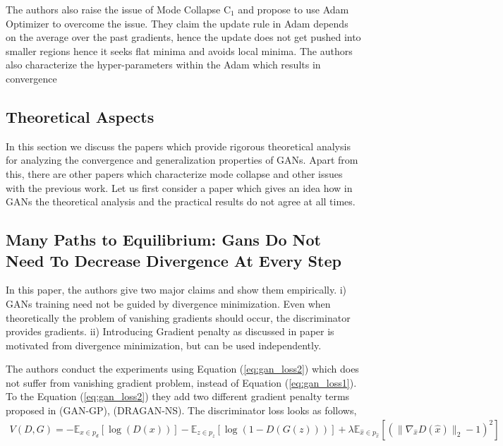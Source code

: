 The authors also raise the issue of Mode Collapse C$_1$ and propose to use Adam Optimizer \citep{adam} to overcome the issue. They claim the update rule in Adam depends on the average over the past gradients, hence the update does not get pushed into smaller regions hence it seeks flat minima and avoids local minima. The authors also  characterize the hyper-parameters within the Adam which results in convergence


\subsection{Theoretical Aspects}
\label{subsec:theory}
In this section we discuss the papers which provide rigorous theoretical analysis for analyzing the convergence and generalization properties of GANs. Apart from this, there are other papers which characterize mode collapse and other issues with the previous work. 
Let us first consider a paper which gives an idea how in GANs the theoretical analysis and the practical results do not agree at all times.

\subsection*{Many Paths to Equilibrium: Gans Do Not Need To Decrease Divergence At Every Step \citep{many}}
In this paper, the authors give two major claims and show them empirically. i) GANs training need not be guided by divergence minimization. Even when theoretically the problem of vanishing gradients should occur, the discriminator provides gradients. ii) Introducing Gradient penalty  as discussed in paper \citep{gularajani} is motivated from divergence minimization, but can be used independently.

The authors conduct the experiments using Equation (\ref{eq:gan_loss2}) which does not suffer from vanishing gradient problem, instead of Equation (\ref{eq:gan_loss1}).
To the Equation (\ref{eq:gan_loss2}) they add two different gradient penalty terms proposed in \citep{gularajani} (GAN-GP), \citep{DRAGAN} (DRAGAN-NS). The discriminator loss looks as follows,
\begin{equation*}
    \begin{aligned}
    V(D, G) = -\mathbb{E}_{x\in p_d}[\log(D(x))] - \mathbb{E}_{z \in p_z}[\log (1 - D(G(z)))] 
    +  \lambda \mathbb{E}_{\hat{x}\in p_{\hat{x}}} [(\parallel\nabla_{\hat{x}} D(\hat{x})\parallel_2 - 1)^2] 
    \end{aligned}{}
\end{equation*}{}

